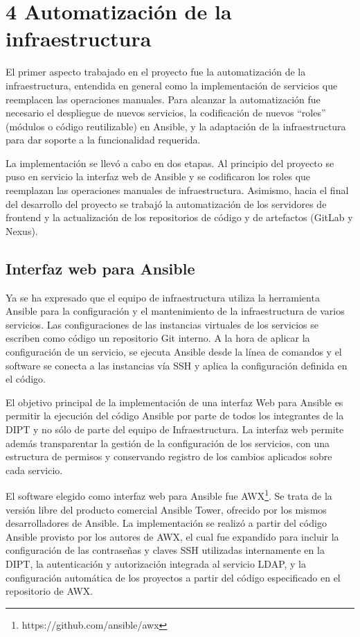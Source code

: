 \section{4 Automatización de la infraestructura}

El primer aspecto trabajado en el proyecto fue la automatización de la infraestructura, entendida en general como la implementación de servicios que reemplacen las operaciones manuales. Para alcanzar la automatización fue necesario el despliegue de nuevos servicios, la codificación de nuevos “roles” (módulos o código reutilizable) en Ansible, y la adaptación de la infraestructura para dar soporte a la funcionalidad requerida.

La implementación se llevó a cabo en dos etapas. Al principio del proyecto se puso en servicio la interfaz web de Ansible y se codificaron los roles que reemplazan las operaciones manuales de infraestructura. Asimismo, hacia el final del desarrollo del proyecto se trabajó la automatización de los servidores de frontend y la actualización de los repositorios de código y de artefactos (GitLab y Nexus).

\subsection{Interfaz web para Ansible}

Ya se ha expresado que el equipo de infraestructura utiliza la herramienta Ansible para la configuración y el mantenimiento de la infraestructura de varios servicios. Las configuraciones de las instancias virtuales de los servicios se escriben como código un repositorio Git interno. A la hora de aplicar la configuración de un servicio, se ejecuta Ansible desde la línea de comandos y el software se conecta a las instancias vía SSH y aplica la configuración definida en el código.

El objetivo principal de la implementación de una interfaz Web para Ansible es permitir la ejecución del código Ansible por parte de todos los integrantes de la DIPT y no sólo de parte del equipo de Infraestructura. La interfaz web permite además transparentar la gestión de la configuración de los servicios, con una estructura de permisos y conservando registro de los cambios aplicados sobre cada servicio.

El software elegido como interfaz web para Ansible fue AWX\footnote{ https://github.com/ansible/awx}. Se trata de la versión libre del producto comercial Ansible Tower, ofrecido por los mismos desarrolladores de Ansible. La implementación se realizó a partir del código Ansible provisto por los autores de AWX, el cual fue expandido para incluir la configuración de las contraseñas y claves SSH utilizadas internamente en la DIPT, la autenticación y autorización integrada al servicio LDAP, y la configuración automática de los proyectos a partir del código especificado en el repositorio de AWX.

